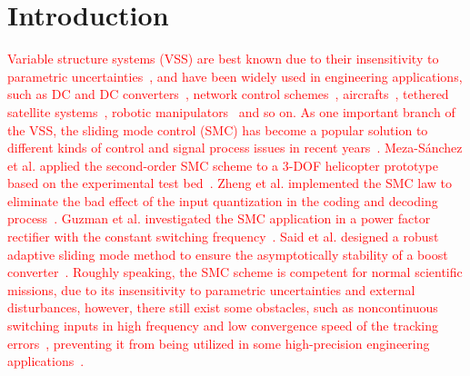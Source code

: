 \documentclass[3p]{elsarticle}
\theoremstyle{plain}
\theoremstyle{remark}
\begin{document}
\section{Introduction}
\textcolor{red}{Variable structure systems (VSS) are best known due to their insensitivity to parametric uncertainties~\cite{slotine1991applied}, and have been widely used in engineering applications, such as DC and DC converters~\cite{Tan2008General}, network control schemes~\cite{Hou2016}, aircrafts~\cite{Loza2015Sensor}, tethered satellite systems~\cite{Ma201667}, robotic manipulators~\cite{Beak2016A} and so on. As one important branch of the VSS, the sliding mode control (SMC) has become a popular solution to different kinds of control and signal process issues in recent years~\cite{zhao2015nonlinear,zhang2015attitude}. Meza-S{\'a}nchez et al. applied the second-order SMC scheme to a 3-DOF helicopter prototype based on the experimental test bed~\cite{meza2015output}. Zheng et al. implemented the SMC law to eliminate the bad effect of the input quantization in the coding and decoding process~\cite{zheng2016sliding}. Guzman et al. investigated the SMC application in a power factor rectifier with the constant switching frequency~\cite{guzman2016sliding}. Said et al. designed a robust adaptive sliding mode method to ensure the asymptotically stability of a boost converter~\cite{oucheriah2013pwm}. Roughly speaking, the SMC scheme is competent for normal scientific missions, due to its insensitivity to parametric uncertainties and external disturbances, however, there still exist some obstacles, such as noncontinuous switching inputs in high frequency and low convergence speed of the tracking errors~\cite{boiko2013chattering,lee2009chattering}, preventing it from being utilized in some high-precision engineering applications~\cite{fridman2011sliding}.}
\end{document}
